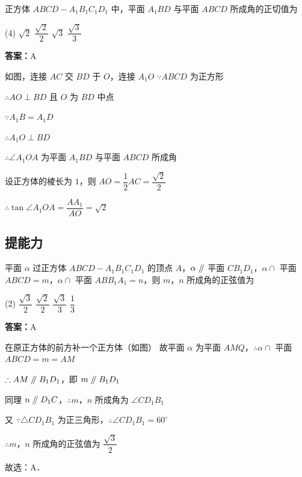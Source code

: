 \begin{example}[\bkstar{2}{5}]
正方体 $ABCD-A_1B_1C_1D_1$ 中，平面 $A_1BD$ 与平面 $ABCD$ 所成角的正切值为
\begin{tasks}(4)
    \task $\sqrt{2}$
    \task $\dfrac{\sqrt{2}}{2}$
    \task $\sqrt{3}$
    \task $\dfrac{\sqrt{3}}{3}$
\end{tasks}
\end{example}
\begin{solution}
\textbf{答案：}A

如图，连接 $AC$ 交 $BD$ 于 $O$，连接 $A_1O$
$\because ABCD$ 为正方形

$\therefore AO\perp BD$ 且 $O$ 为 $BD$ 中点

$\because A_1B=A_1D$

$\therefore A_1O\perp BD$

$\therefore \angle A_1OA$ 为平面 $A_1BD$ 与平面 $ABCD$ 所成角

设正方体的棱长为 $1$，则 $AO=\dfrac{1}{2}AC=\dfrac{\sqrt{2}}{2}$

$\therefore \tan\angle A_1OA=\dfrac{AA_1}{AO}=\sqrt{2}$
\end{solution}

\vspace{2em}

\subsection{提能力}

\begin{example}[\bkstar{4}{5}]
平面 $\alpha$ 过正方体 $ABCD-A_1B_1C_1D_1$ 的顶点 $A$，$\alpha\mathrel{/\mkern-5mu/}$ 平面 $CB_1D_1$，$\alpha\cap$ 平面 $ABCD=m$，$\alpha\cap$ 平面 $ABB_1A_1=n$，则 $m$，$n$ 所成角的正弦值为
\begin{tasks}(2)
    \task $\dfrac{\sqrt{3}}{2}$
    \task $\dfrac{\sqrt{2}}{2}$
    \task $\dfrac{\sqrt{3}}{3}$
    \task $\dfrac{1}{3}$
\end{tasks}
\end{example}
\begin{solution}
\textbf{答案：}A

在原正方体的前方补一个正方体（如图）
故平面 $\alpha$ 为平面 $AMQ$，$\therefore \alpha\cap$ 平面 $ABCD=m=AM$

$\therefore AM\mathrel{/\mkern-5mu/} B_1D_1$，即 $m\mathrel{/\mkern-5mu/} B_1D_1$

同理 $n\mathrel{/\mkern-5mu/} D_1C$，$\therefore m$，$n$ 所成角为 $\angle CD_1B_1$

又 $\because \triangle CD_1B_1$ 为正三角形，$\therefore \angle CD_1B_1=60^{\circ}$

$\therefore m$，$n$ 所成角的正弦值为 $\dfrac{\sqrt{3}}{2}$

故选：A．
\end{solution}

